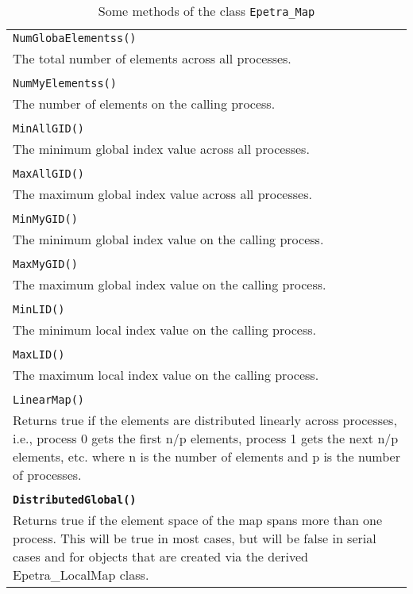 \begin{table}
\begin{center}
\begin{tabular}{ | p{15cm} | }
\hline
\verb!NumGlobaElementss()!\\
The total number of elements across all processes. \\
\\
\verb!NumMyElementss()!\\
The number of elements on the calling process. \\
\\
 \verb!MinAllGID()! \\
The minimum global index value across all processes.  \\
\\
 \verb!MaxAllGID()! \\
The maximum global index value across all processes. \\
\\
 \verb!MinMyGID()!\\
The minimum global index value on the calling process. \\
\\
 \verb!MaxMyGID()! \\
The maximum global index value on the calling process. \\
\\
 \verb!MinLID()! \\
The minimum local index value on the calling process. \\
\\
 \verb!MaxLID()! \\
The maximum local index value on the calling process. \\
\\
 \verb!LinearMap()! \\
Returns true if the elements are distributed linearly across processes,
i.e., process 0 gets the first n/p elements, process 1 gets the next
n/p elements, etc. where n is the number of elements and p is the number
of processes.  \\
\\
\bf \verb!DistributedGlobal()! \\
Returns true if the element space of the map spans more than one
process. This will be true in most cases, but will be false in serial
cases and for objects that are created via the derived Epetra\_LocalMap
class.  \\
\hline
\end{tabular}
\caption{Some methods of the class {\tt Epetra\_Map}}
\label{tab:epetra_map}
\end{center}
\end{table}

